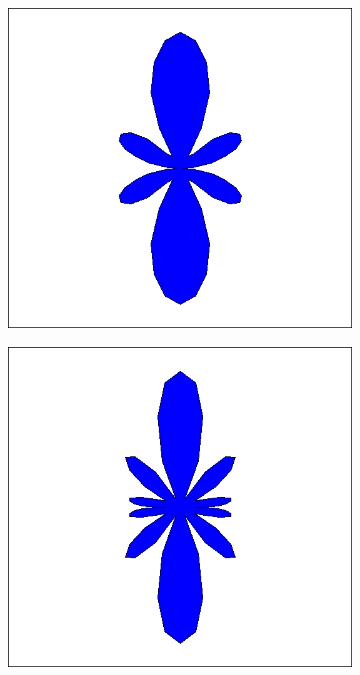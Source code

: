 \begin{figure}
\begin{subfigure}{0.4\textwidth}
\includegraphics[width=\textwidth]{content/messungen/Chapter2new/2_3_3.jpg}
\label{fig:2_3_3}
\end{subfigure}
\begin{subfigure}{0.4\textwidth}
\includegraphics[width=\textwidth]{content/messungen/Chapter2new/2_3_4.jpg}
\label{fig:2_3_4}
\end{subfigure}


\end{figure}
